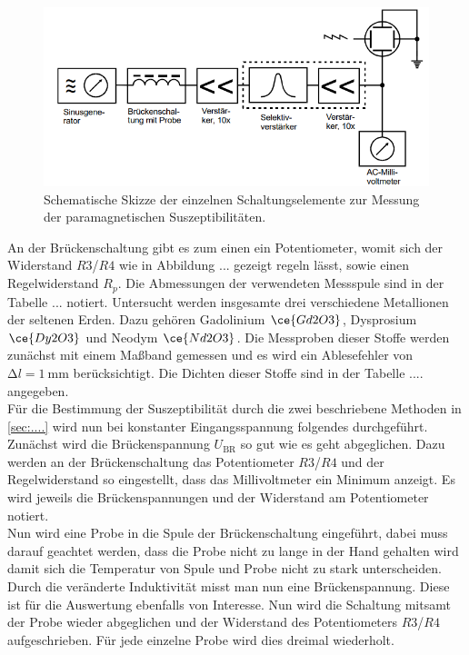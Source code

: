 \begin{figure}
    \centering
    \includegraphics[width=\textwidth]{bilder/aufbaumessung.png}
    \caption{Schematische Skizze der einzelnen Schaltungselemente zur Messung der paramagnetischen Suszeptibilitäten. \cite{skript}} 
    \label{fig:aufbaumessung}
\end{figure}

An der Brückenschaltung gibt es zum einen ein Potentiometer, womit sich der Widerstand $R3$/$R4$ wie in Abbildung ... gezeigt regeln lässt, sowie einen Regelwiderstand $R_{p}$. Die Abmessungen der verwendeten Messspule sind in der Tabelle ... notiert. 
Untersucht werden insgesamte drei verschiedene Metallionen der seltenen Erden. Dazu gehören Gadolinium $\ce{Gd2O3}$, Dysprosium $\ce{Dy2O3}$ und Neodym $\ce{Nd2O3}$. Die Messproben dieser Stoffe werden zunächst mit einem Maßband gemessen und es wird ein Ablesefehler von
$\increment l= \SI{1}{\milli\meter}$ berücksichtigt. Die Dichten dieser Stoffe sind in der Tabelle .... angegeben.
\\
\newline
Für die Bestimmung der Suszeptibilität durch die zwei beschriebene Methoden in \ref{sec:....} wird nun bei konstanter Eingangsspannung folgendes durchgeführt. 
Zunächst wird die Brückenspannung $U_{\text{BR}}$ so gut wie es geht abgeglichen. Dazu werden an der Brückenschaltung das Potentiometer $R3$/$R4$ und der Regelwiderstand so eingestellt, dass das Millivoltmeter ein Minimum anzeigt. Es wird jeweils die Brückenspannungen und der
Widerstand am Potentiometer notiert. 
\\
Nun wird eine Probe in die Spule der Brückenschaltung eingeführt, dabei muss darauf geachtet werden, dass die Probe nicht zu lange in der Hand gehalten wird damit sich die Temperatur von Spule und Probe nicht zu stark unterscheiden. Durch die 
veränderte Induktivität misst man nun eine Brückenspannung. Diese ist für die Auswertung ebenfalls von Interesse. Nun wird die Schaltung mitsamt der Probe wieder abgeglichen und der Widerstand des Potentiometers $R3$/$R4$ aufgeschrieben. Für
jede einzelne Probe wird dies dreimal wiederholt.